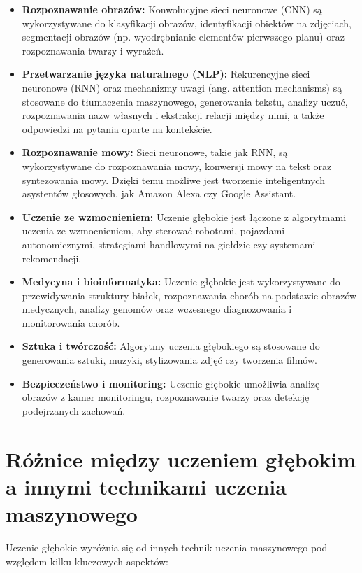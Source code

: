 \begin{itemize}
\item \textbf{Rozpoznawanie obrazów:} Konwolucyjne sieci neuronowe (CNN) są wykorzystywane do klasyfikacji obrazów, identyfikacji obiektów na zdjęciach, segmentacji obrazów (np. wyodrębnianie elementów pierwszego planu) oraz rozpoznawania twarzy i wyrażeń.

\item \textbf{Przetwarzanie języka naturalnego (NLP):} Rekurencyjne sieci neuronowe (RNN) oraz mechanizmy uwagi (ang. attention mechanisms) są stosowane do tłumaczenia maszynowego, generowania tekstu, analizy uczuć, rozpoznawania nazw własnych i ekstrakcji relacji między nimi, a także odpowiedzi na pytania oparte na kontekście.

\item \textbf{Rozpoznawanie mowy:} Sieci neuronowe, takie jak RNN, są wykorzystywane do rozpoznawania mowy, konwersji mowy na tekst oraz syntezowania mowy. Dzięki temu możliwe jest tworzenie inteligentnych asystentów głosowych, jak Amazon Alexa czy Google Assistant.

\item \textbf{Uczenie ze wzmocnieniem:} Uczenie głębokie jest łączone z algorytmami uczenia ze wzmocnieniem, aby sterować robotami, pojazdami autonomicznymi, strategiami handlowymi na giełdzie czy systemami rekomendacji.

\item \textbf{Medycyna i bioinformatyka:} Uczenie głębokie jest wykorzystywane do przewidywania struktury białek, rozpoznawania chorób na podstawie obrazów medycznych, analizy genomów oraz wczesnego diagnozowania i monitorowania chorób.

\item \textbf{Sztuka i twórczość:} Algorytmy uczenia głębokiego są stosowane do generowania sztuki, muzyki, stylizowania zdjęć czy tworzenia filmów.

\item \textbf{Bezpieczeństwo i monitoring:} Uczenie głębokie umożliwia analizę obrazów z kamer monitoringu, rozpoznawanie twarzy oraz detekcję podejrzanych zachowań.

\end{itemize}

\section{Różnice między uczeniem głębokim a innymi technikami uczenia maszynowego}
Uczenie głębokie wyróżnia się od innych technik uczenia maszynowego pod względem kilku kluczowych aspektów:

